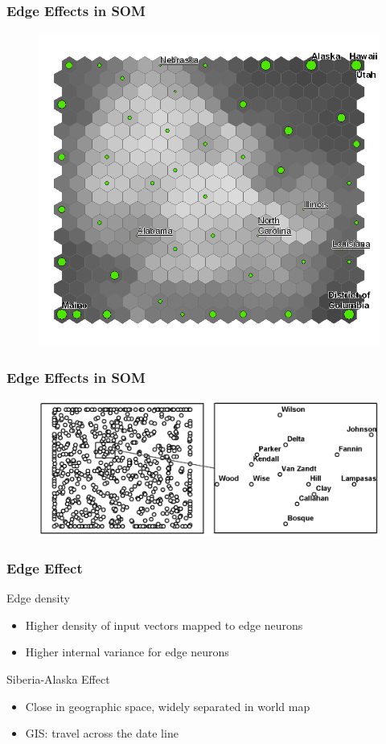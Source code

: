 \documentclass[nototal,handout]{beamer}
\begin{document}
\begin{frame}
	\frametitle{Edge Effects in SOM}
  \begin{center}
  \begin{figure}
  \includegraphics[width=0.60\linewidth]{states.png}
  \end{figure}
  \end{center}
 \end{frame} 

\begin{frame}
	\frametitle{Edge Effects in SOM}
  \begin{center}
  \begin{figure}
  \includegraphics[width=0.90\linewidth]{edge1.png}
  \end{figure}
  \end{center}
 \end{frame} 

\begin{frame}
	\frametitle{Edge Effect}
 
\begin{block}{Edge density}
 \begin{itemize}
 \item  Higher density of input vectors mapped to edge neurons
 \item  Higher internal variance for edge neurons
 \end{itemize}
 \end{block} 
\begin{block}{Siberia-Alaska Effect}
 \begin{itemize}
 \item  Close in geographic space, widely separated in world map
 \item  GIS: travel across the date line
 \end{itemize}
 \end{block} \end{frame} 
\end{document}

